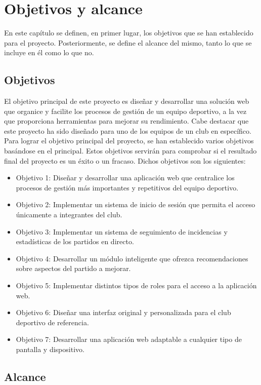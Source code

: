 \chapter{Objetivos y alcance}

En este capítulo se definen, en primer lugar,  los objetivos que se han establecido para el proyecto. Posteriormente, se define el alcance del mismo, tanto lo que se incluye en él como lo que no.

\section{Objetivos}

El objetivo principal de este proyecto es diseñar y desarrollar una solución web que organice y facilite los procesos de gestión de un equipo deportivo, a la vez que proporciona herramientas para mejorar su rendimiento. Cabe destacar que este proyecto ha sido diseñado para uno de los equipos de un club en específico. Para lograr el objetivo principal del proyecto, se han establecido varios objetivos basándose en el principal. Estos objetivos servirán para comprobar si el resultado final del proyecto es un éxito o un fracaso. Dichos objetivos son los siguientes:

\begin{itemize}
  \item Objetivo 1: Diseñar y desarrollar una aplicación web que centralice los procesos de gestión más importantes y repetitivos del equipo deportivo.
  \item Objetivo 2: Implementar un sistema de inicio de sesión que permita el acceso únicamente a integrantes del club.
  \item Objetivo 3: Implementar un sistema de seguimiento de incidencias y estadísticas de los partidos en directo.
  \item Objetivo 4: Desarrollar un módulo inteligente que ofrezca recomendaciones sobre aspectos del partido a mejorar.
  \item Objetivo 5: Implementar distintos tipos de roles para el acceso a la aplicación web.
  \item Objetivo 6: Diseñar una interfaz original y personalizada para el club deportivo de referencia.
  \item Objetivo 7: Desarrollar una aplicación web adaptable a cualquier tipo de pantalla y dispositivo.
\end{itemize}

\section{Alcance}

